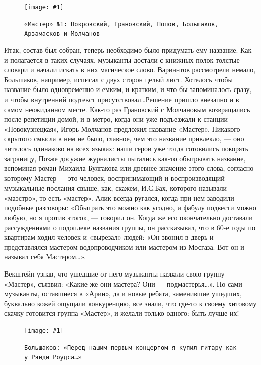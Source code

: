 \documentclass[16pt,a5paper]{book}
\newcommand{\myincludegraphics}[1]{\texttt{[image: \#1]}}
\begin{document}
\begin{figure}[h]
    \centering
    \myincludegraphics{Image16}
    \caption{\texttt{«Мастер» №1: Покровский, Грановский, Попов, Большаков, Арзамасков и Молчанов}}
\end{figure}

Итак, состав был собран, теперь необходимо было придумать ему название. Как и полагается в таких случаях, музыканты
достали с книжных полок толстые словари и начали искать в них магическое слово. Вариантов рассмотрели немало, Большаков,
например, исписал с двух сторон целый лист. Хотелось чтобы название было одновременно и емким, и кратким, и что бы
запоминалось сразу, и чтобы внутренний подтекст присутствовал\ldots Решение пришло внезапно и в самом неожиданном месте.
Как-то раз Грановский с Молчановым возвращались после репетиции домой, и в метро, когда они уже подъезжали к станции
«Новокузнецкая», Игорь Молчанов предложил название «Мастер». Никакого скрытого смысла в нем не было, главное, чем это
название привлекло, — оно читалось одинаково на всех языках: наши герои уже тогда готовились покорять заграницу, Позже
досужие журналисты пытались как-то обыгрывать название, вспоминая роман Михаила Булгакова или древнее значение этого
слова, согласно которому Мастер — это человек, воспринимающий и воспроизводящий музыкальные послания свыше, как, скажем,
И.С.Бах, которого называли «маэстро», то есть «мастер». Алик всегда ругался, когда при нем заводили подобные разговоры:
«Обыграть это можно как угодно, и фабулу подвести можно любую, но я против этого», — говорил он. Когда же его
окончательно доставали рассуждениями о подоплеке названия группы, он рассказывал, что в 60-е годы по квартирам ходил
человек и «вырезал» людей: «Он звонил в дверь и представлялся мастером-водопроводчиком или мастером из Мосгаза. Вот он и
называл себя Мастером\ldots».

Векштейн узнав, что ушедшие от него музыканты назвали свою группу «Мастер», съязвил: «Какие же они мастера? Они —
подмастерья\ldots». Но сами музыканты, оставшиеся в «Арии», да и новые ребята, заменившие ушедших, буквально кожей
ощущали конкуренцию, все знали, что где-то к своему хитовому скачку готовится группа «Мастер», и желали только одного:
быть лучше их!

\begin{figure}
    \centering
    \myincludegraphics{Image17}
    \caption{\texttt{Большаков: «Перед нашим первым концертом я купил гитару как у Рэнди Роудса\ldots»}}
\end{figure}
\end{document}
